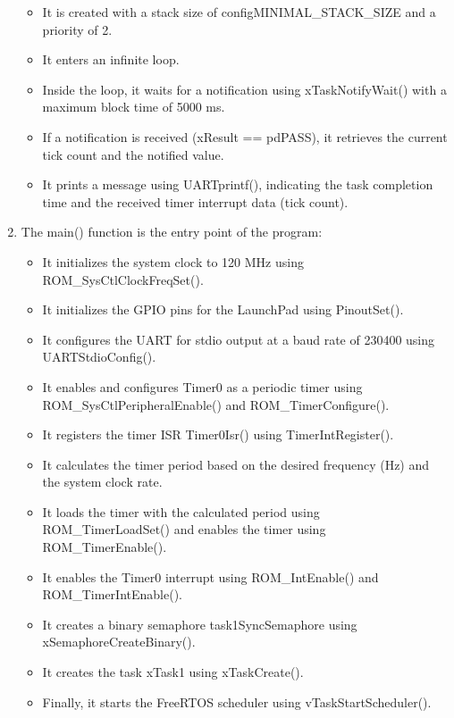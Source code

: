 \documentclass[a4paper,11pt]{article}%
\newenvironment{qanda}{\setlength{\parindent}{0pt}}{\bigskip}
\begin{document}
\begin{qanda}
\begin{enumerate}
\begin{itemize}
			\item It is created with a stack size of configMINIMAL\_STACK\_SIZE and a priority of 2.
			\item It enters an infinite loop.
			\item Inside the loop, it waits for a notification using xTaskNotifyWait() with a maximum block time of 5000 ms.
			\item If a notification is received (xResult == pdPASS), it retrieves the current tick count and the notified value.
			\item It prints a message using UARTprintf(), indicating the task completion time and the received timer interrupt data (tick count).
		\end{itemize}
		\item The main() function is the entry point of the program:
		\begin{itemize}
			\item It initializes the system clock to 120 MHz using ROM\_SysCtlClockFreqSet().
			\item It initializes the GPIO pins for the LaunchPad using PinoutSet().
			\item It configures the UART for stdio output at a baud rate of 230400 using UARTStdioConfig().
			\item It enables and configures Timer0 as a periodic timer using ROM\_SysCtlPeripheralEnable() and ROM\_TimerConfigure().
			\item It registers the timer ISR Timer0Isr() using TimerIntRegister().
			\item It calculates the timer period based on the desired frequency (Hz) and the system clock rate.
			\item It loads the timer with the calculated period using ROM\_TimerLoadSet() and enables the timer using ROM\_TimerEnable().
			\item It enables the Timer0 interrupt using ROM\_IntEnable() and ROM\_TimerIntEnable().
			\item It creates a binary semaphore task1SyncSemaphore using xSemaphoreCreateBinary().
			\item It creates the task xTask1 using xTaskCreate().
			\item Finally, it starts the FreeRTOS scheduler using vTaskStartScheduler().
		\end{itemize}
	\end{enumerate}
	

\end{qanda}
\end{document}
